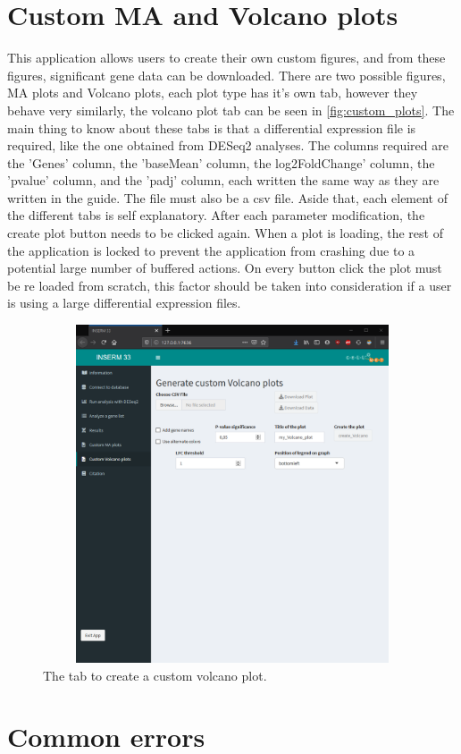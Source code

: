 \documentclass[11pt]{article}
\begin{document}
\section{Custom MA and Volcano plots \label{custom_plots}}
This application allows users to create their own custom figures, and from these figures, significant gene data can be downloaded. There are two possible figures, MA plots and Volcano plots, each plot type has it's own tab, however they behave very similarly, the volcano plot tab can be seen in \autoref{fig:custom_plots}. 
The main thing to know about these tabs is that a differential expression file is required, like the one obtained from DESeq2 analyses. The columns required are the 'Genes' column, the 'baseMean' column, the log2FoldChange' column, the 'pvalue' column, and the 'padj' column, each written the same way as they are written in the guide. The file must also be a csv file.
Aside that, each element of the different tabs is self explanatory. After each parameter modification, the create plot button needs to be clicked again. When a plot is loading, the rest of the application is locked to prevent the application from crashing due to a potential large number of buffered actions. On every button click the plot must be re loaded from scratch, this factor should be taken into consideration if a user is using a large differential expression files.

\begin{figure}[h!]
\centering
\includegraphics[width=15cm,height=10cm,keepaspectratio]{custom_volcano_tab.png}
\caption{The tab to create a custom volcano plot.}
\label{fig:custom_plots}
\end{figure}





\newpage
\section{Common errors \label{common_err}}



\end{document}

